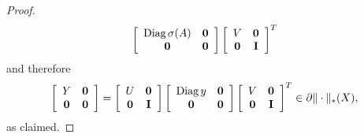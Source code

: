 \documentclass[smallextended,numbook]{svjour3}
\begin{document}
\begin{proof}
$$\left[ \begin{array}{ccc}
 {\mbox{\rm Diag}\,} \sigma(A) & {\bf 0}  \\
{\bf 0}  & {\bf 0} \end{array} \right]\left[ \begin{array}{ccc}
V & {\bf 0}  \\
{\bf 0} & {\bf I} \end{array} \right]^T $$
and therefore $$\left[ \begin{array}{ccc}
Y & {\bf 0}  \\
{\bf 0} & {\bf 0} \end{array} \right]
=\left[ \begin{array}{ccc}
U & {\bf 0}  \\
{\bf 0} & {\bf I} \end{array} \right] 
\left[ \begin{array}{ccc}
 {\mbox{\rm Diag}\,} y & {\bf 0}  \\
{\bf 0}  & {\bf 0} \end{array} \right]\left[ \begin{array}{ccc}
V & {\bf 0}  \\
{\bf 0} & {\bf I} \end{array} \right]^T\in \partial \|\cdot\|_{*}(X),$$
as claimed.


\end{proof}
\end{document}
